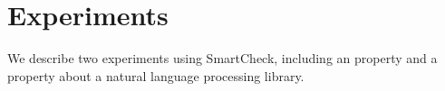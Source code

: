 \documentclass{sigplanconf}
\newcommand{\ttp}[1]{\texttt{#1}}
\begin{document}
\section{Experiments}\label{sec:experiments}
We describe two experiments using SmartCheck, including an \xmonad property and a
property about a natural language processing library.

\end{document}
